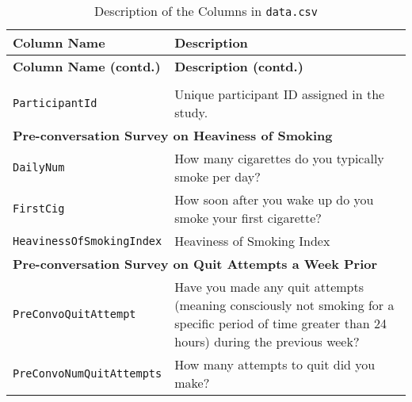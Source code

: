 \begin{longtable}{l p{10cm}}
	\caption{Description of the Columns in \texttt{data.csv}}                                                                                                                           \\

	\toprule
	\textbf{Column Name}              & \textbf{Description}                                                                                                                            \\
	\midrule
	\endfirsthead

	\toprule
	\textbf{Column Name (contd.)}     & \textbf{Description (contd.)}                                                                                                                   \\
	\midrule
	\endhead


	\endfoot

	\bottomrule
	\endlastfoot

	\multicolumn{2}{l}{\textbf{Basic}}                                                                                                                                                  \\
	\texttt{ParticipantId}            & Unique participant ID assigned in the study.                                                                                                    \\
	\midrule


	\multicolumn{2}{l}{\textbf{Pre-conversation Survey on Heaviness of Smoking}}                                                                                                        \\
	\texttt{DailyNum}                 & How many cigarettes do you typically smoke per day?                                                                                             \\
	\texttt{FirstCig}                 & How soon after you wake up do you smoke your first cigarette?                                                                                   \\
	\texttt{HeavinessOfSmokingIndex}  & Heaviness of Smoking Index~\citep{heatherton1989measuring}                                                                                      \\
	\midrule

	\multicolumn{2}{l}{\textbf{Pre-conversation Survey on Quit Attempts a Week Prior}}                                                                                                  \\
	\texttt{PreConvoQuitAttempt}      & Have you made any quit attempts (meaning consciously not smoking for a specific period of time greater than 24 hours) during the previous week? \\
	\texttt{PreConvoNumQuitAttempts}  & How many attempts to quit did you make?                                                                                                         \\
	\midrule



\end{longtable}
